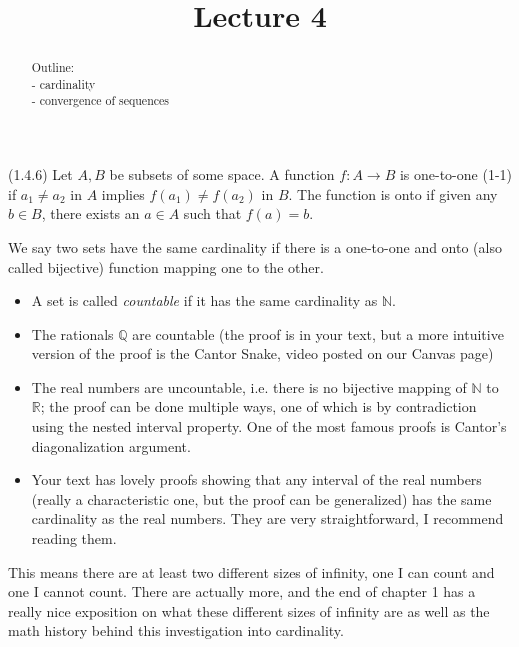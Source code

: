 \documentclass{ximera}
\begin{document}
    \title{Lecture 4}
    
    \begin{abstract}  
    Outline: \\
    - cardinality \\
    - convergence of sequences
\end{abstract}

\maketitle

\begin{definition}{(1.4.6)}
    Let $A,B$ be subsets of some space.  A function $f:A\to B$ is one-to-one (1-1) if $a_1 \neq a_2$ in $A$ implies $f(a_1)\neq f(a_2)$ in $B$.  The function is onto if given any $b \in B$, there exists an $a \in A$ such that $f(a) = b$.
\end{definition}

We say two sets have the same cardinality if there is a one-to-one and onto (also called bijective) function mapping one to the other.

\begin{itemize}
\item A set is called \textit{countable} if it has the same cardinality as $\mathbb{N}$.
\item The rationals $\mathbb{Q}$ are countable (the proof is in your text, but a more intuitive version of the proof is the Cantor Snake, video posted on our Canvas page)
\item The real numbers are uncountable, i.e. there is no bijective mapping of $\mathbb{N}$ to $\mathbb{R}$; the proof can be done multiple ways, one of which is by contradiction using the nested interval property.  One of the most famous proofs is Cantor's diagonalization argument.
\item Your text has lovely proofs showing that any interval of the real numbers (really a characteristic one, but the proof can be generalized) has the same cardinality as the real numbers.  They are very straightforward, I recommend reading them.
\end{itemize}

This means there are at least two different sizes of infinity, one I can count and one I cannot count.  There are actually more, and the end of chapter 1 has a really nice exposition on what these different sizes of infinity are as well as the math history behind this investigation into cardinality.
\end{document}
